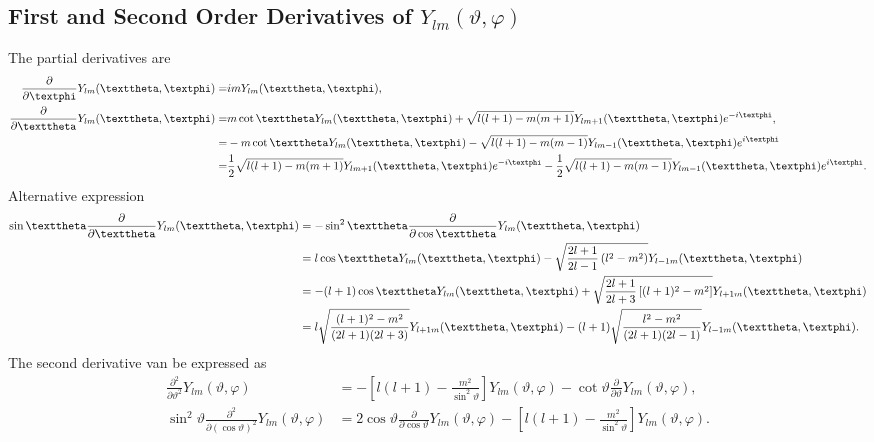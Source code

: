 \subsection{First and Second Order Derivatives of $Y_{l m}(\vartheta, \varphi)$}\label{sec:5.8.2}
The partial derivatives are
\begin{align}
\frac{\partial}{\partial \varphi} Y_{l m}(\vartheta, \varphi)=&i m Y_{l m}(\vartheta, \varphi), \label{eq:5:8:4}\\
\frac{\partial}{\partial \vartheta} Y_{l m}(\vartheta, \varphi) =&m \cot \vartheta Y_{l m}(\vartheta, \varphi)+\sqrt{l(l+1)-m(m+1)} Y_{l m+1}(\vartheta, \varphi) e^{-i \varphi},  \notag\\
 =&-m \cot \vartheta Y_{l m}(\vartheta, \varphi)-\sqrt{l(l+1)-m(m-1)} Y_{l m-1}(\vartheta, \varphi) e^{i \varphi}  \notag\\
 =&\frac{1}{2} \sqrt{l(l+1)-m(m+1)} Y_{l m+1}(\vartheta, \varphi) e^{-i \varphi}-\frac{1}{2} \sqrt{l(l+1)-m(m-1)} Y_{l m-1}(\vartheta, \varphi) e^{i \varphi}. \label{eq:5:8:5}
\end{align}
Alternative expression
\begin{align}
\sin \vartheta \frac{\partial}{\partial \vartheta} Y_{l m}(\vartheta, \varphi)&=-\sin ^{2} \vartheta \frac{\partial}{\partial \cos \vartheta} Y_{l m}(\vartheta, \varphi)  \notag\\
&=l \cos \vartheta Y_{l m}(\vartheta, \varphi)-\sqrt{\frac{2 l+1}{2 l-1}\left(l^{2}-m^{2}\right)} Y_{l-1 m}(\vartheta, \varphi)  \notag\\
&=-(l+1) \cos \vartheta Y_{l m}(\vartheta, \varphi)+\sqrt{\frac{2 l+1}{2 l+3}\left[(l+1)^{2}-m^{2}\right]} Y_{l+1 m}(\vartheta, \varphi)  \notag\\
&=l \sqrt{\frac{(l+1)^{2}-m^{2}}{(2 l+1)(2 l+3)}} Y_{l+1 m}(\vartheta, \varphi)-(l+1) \sqrt{\frac{l^{2}-m^{2}}{(2 l+1)(2 l-1)}} Y_{l-1 m}(\vartheta, \varphi).  \label{eq:5:8:6}
\end{align}
The second derivative van be expressed as
\begin{align}
\frac{\partial^{2}}{\partial \vartheta^{2}} Y_{l m}(\vartheta, \varphi)&=-\left[l(l+1)-\frac{m^{2}}{\sin ^{2} \vartheta}\right] Y_{l m}(\vartheta, \varphi)-\cot \vartheta \frac{\partial}{\partial \vartheta} Y_{l m}(\vartheta, \varphi),  \label{eq:5:8:7}\\
\sin ^{2} \vartheta \frac{\partial^{2}}{\partial(\cos \vartheta)^{2}} Y_{l m}(\vartheta, \varphi)&=2 \cos \vartheta \frac{\partial}{\partial \cos \vartheta} Y_{l m}(\vartheta, \varphi)-\left[l(l+1)-\frac{m^{2}}{\sin ^{2} \vartheta}\right] Y_{l m}(\vartheta, \varphi) . \label{eq:5:8:8}
\end{align}
